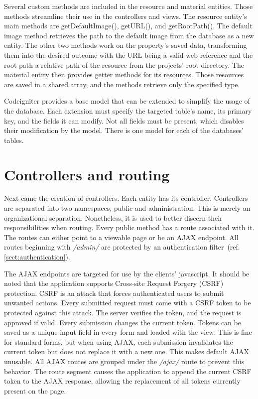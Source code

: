 \documentclass[
  digital,     %
  oneside,     %
  nosansbold,  %
  colorbold, %
  lof,         %
  lot,         %
]{fithesis4}
\newcommand{\cref}[1]{(ref. \ref{#1})}
\begin{document}
Several custom methods are included in the resource and material entities. Those methods streamline
their use in the controllers and views. The resource entity's main methods are getDefaultImage(),
getURL(), and getRootPath(). The default image method retrieves the path to the default image from
the database as a new entity. The other two methods work on the property's saved data, transforming
them into the desired outcome with the URL being a valid web reference and the root path a relative
path of the resource from the projects' root directory. The material entity then provides getter
methods for its resources. Those resources are saved in a shared array, and the methods retrieve only
the specified type.

Codeigniter provides a base model that can be extended to simplify the usage of the database. Each
extension must specify the targeted table's name, its primary key, and the fields it can modify. Not all
fields must be present, which disables their modification by the model. There is one model for each of
the databases' tables.

\section{Controllers and routing}

Next came the creation of controllers. Each entity has its controller. Controllers are separated into two
namespaces, public and administration. This is merely an organizational separation. Nonetheless, it is
used to better discern their responsibilities when routing. Every public method has a route associated
with it. The routes can either point to a viewable page or be an AJAX endpoint. All routes beginning
with \textit{/admin/} are protected by an authentication filter~\cref{sect:authentication}.

The AJAX endpoints are targeted for use by the clients' javascript. It should be noted that the
application supports Cross-site Request Forgery (CSRF) protection. CSRF is an attack that forces
authenticated users to submit unwanted actions. Every submitted request must come with a CSRF
token to be protected against this attack. The server verifies the token, and the request is approved if
valid. Every submission changes the current token. Tokens can be saved as a unique input field in every
form and loaded with the view. This is fine for standard forms, but when using AJAX, each submission
invalidates the current token but does not replace it with a new one. This makes default AJAX
unusable. All AJAX routes are grouped under the \textit{/ajax/} route to prevent this behavior. The
route segment causes the application to append the current CSRF token to the AJAX response,
allowing the replacement of all tokens currently present on the page.
\end{document}

